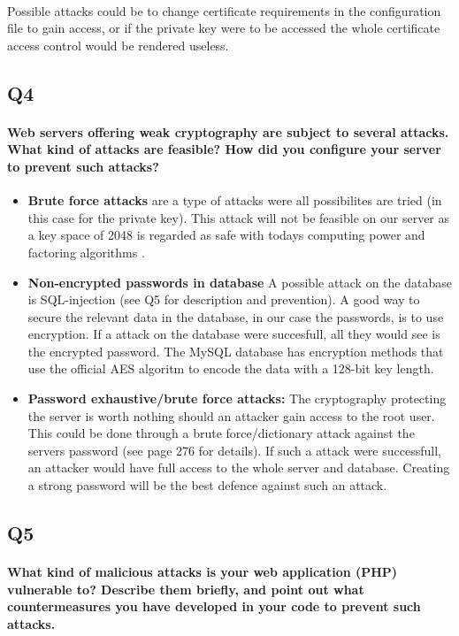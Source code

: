 \documentclass[a4paper,11pt]{article}
\begin{document}
\paragraph{}Possible attacks could be to change certificate requirements in the configuration file to gain access, or if the private key were to be accessed the whole certificate access control would be rendered useless.
\subsection{Q4}
\paragraph{Web servers offering weak cryptography are subject to several attacks. What kind of attacks are feasible? How did you configure your server to prevent such attacks?}
\begin{itemize}
	\item \textbf{Brute force attacks} are a type of attacks were all possibilites are tried (in this case for the private key). This attack will not be feasible on our server as a key space of 2048 is regarded as safe with todays computing power and factoring algorithms \cite{5}.
	\item \textbf{Non-encrypted passwords in database} A possible attack on the database is SQL-injection (see Q5 for description and prevention). A good way to secure the relevant data in the database, in our case the passwords, is to use encryption. If a attack on the database were succesfull, all they would see is the encrypted password. The MySQL database has encryption methods that use the official AES algoritm to encode the data with a 128-bit key length.
	\item \textbf{Password exhaustive/brute force attacks:} The cryptography protecting the server is worth nothing should an attacker gain access to the root user. This could be done through a brute force/dictionary attack against the servers password (see \cite{6} page  276 for details). If such a attack were successfull, an attacker would have full access to the whole server and database. Creating a strong password will be the best defence against such an attack.
\end{itemize}
\subsection{Q5}
\paragraph{What kind of malicious attacks is your web application (PHP) vulnerable to? Describe
them brieﬂy, and point out what countermeasures you have developed in your code to prevent
such attacks.}
\end{document}
